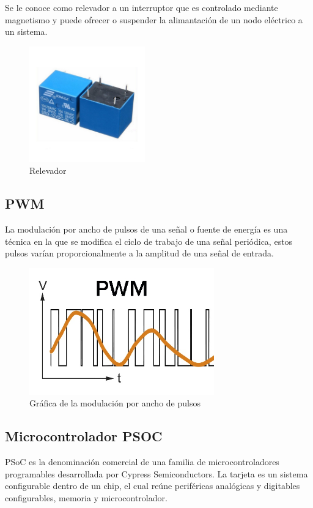 \documentclass[]{article}
\begin{document}
 Se le conoce como relevador a un interruptor que es controlado mediante magnetismo y puede ofrecer o suspender la alimantación de un nodo eléctrico a un sistema.
\clearpage
 \begin{figure}[htb]
     \centering
     \includegraphics[width=5cm]{Imagenes/Rele-12V.jpg}
     \caption{Relevador}
 \end{figure}

 \subsection{PWM}

La modulación por ancho de pulsos de una señal o fuente de energía es una técnica en la que se modifica el ciclo de trabajo de una señal periódica, estos pulsos varían proporcionalmente
a la amplitud de una señal de entrada.

\begin{figure}[htb]
    \centering
    \includegraphics[width=8cm]{Imagenes/PWM.jpg}
    \caption{ Gráfica de la modulación por ancho de pulsos}
\end{figure}

\subsection{Microcontrolador PSOC}

PSoC es la denominación comercial de una familia de microcontroladores programables desarrollada por Cypress Semiconductors. La tarjeta es un sistema configurable
dentro de un chip, el cual reúne periféricas analógicas y digitables configurables, memoria y microcontrolador.
\end{document}
